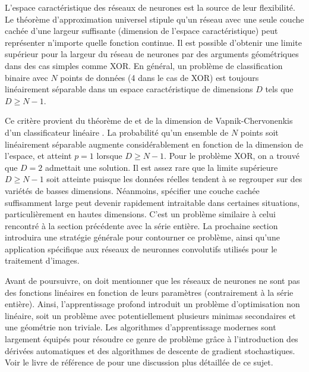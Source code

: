 L'espace caractéristique des réseaux de neurones est la source de leur flexibilité. Le théorème d'approximation universel 
\citep{Cybenko1989,Hornik1991} stipule 
qu'un réseau avec une seule couche cachée d'une largeur suffisante (dimension de l'espace caractéristique) peut représenter 
n'importe quelle fonction continue.
Il est possible d'obtenir une limite supérieur pour la largeur du réseau de neurones par des arguments géométriques dans des cas simples comme XOR.
En général, un problème de classification binaire avec $N$ points de données (4 dans le cas de XOR) est toujours linéairement séparable dans 
un espace caractéristique de dimensions $D$ tels que $D \geq N - 1$. 

Ce critère provient du théorème de \citet{Cover1965} et de la dimension de Vapnik-Chervonenkis d'un classificateur linéaire \citep{Vapnik1971,Vapnik1995}. 
La probabilité qu'un ensemble de $N$ points soit linéairement séparable augmente 
considérablement en fonction de la dimension de l'espace, et atteint $p = 1$ lorsque $D \geq N -1$.
Pour le problème XOR, on a trouvé que $D=2$ admettait une solution. 
Il est assez rare que la limite supérieure $D \geq N -1 $ soit 
atteinte puisque les données réelles tendent à se regrouper sur des variétés de basses dimensions. 
Néanmoins, spécifier une couche cachée suffisamment large peut devenir rapidement intraitable dans certaines situations, 
particulièrement en hautes dimensions. C'est un problème similaire à celui rencontré à la section précédente avec la série entière. 
La prochaine section introduira une stratégie générale pour contourner ce problème, ainsi qu'une application spécifique aux réseaux de neuronnes 
convolutifs utilisés pour le traitement d'images.

Avant de poursuivre, on doit mentionner que les réseaux de neurones 
ne sont pas des fonctions linéaires en fonction de leurs paramètres (contrairement à la série entière). 
Ainsi, l'apprentissage profond introduit un problème d'optimisation non linéaire, soit un problème avec 
potentiellement plusieurs minimas secondaires et une géométrie non triviale.
Les algorithmes d'apprentissage modernes
sont largement équipés pour résoudre ce genre de problème grâce à l'introduction des dérivées automatiques et 
des algorithmes de descente de gradient stochastiques. Voir le livre de référence de \citet{Goodfellow2016} 
pour une discussion plus détaillée de ce sujet.

